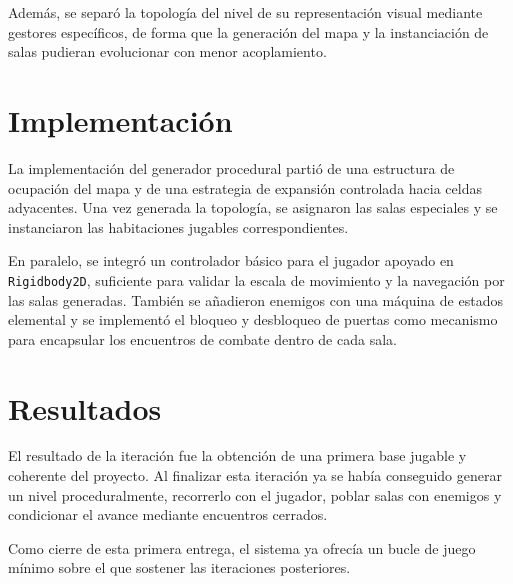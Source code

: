 Además, se separó la topología del nivel de su representación visual mediante gestores
específicos, de forma que la generación del mapa y la instanciación de salas pudieran
evolucionar con menor acoplamiento.

\section{Implementación}
La implementación del generador procedural partió de una estructura de ocupación del mapa y
de una estrategia de expansión controlada hacia celdas adyacentes. Una vez generada la
topología, se asignaron las salas especiales y se instanciaron las habitaciones jugables
correspondientes.

En paralelo, se integró un controlador básico para el jugador apoyado en
\texttt{Rigidbody2D}, suficiente para validar la escala de movimiento y la navegación por
las salas generadas. También se añadieron enemigos con una máquina de estados elemental y
se implementó el bloqueo y desbloqueo de puertas como mecanismo para encapsular los
encuentros de combate dentro de cada sala.

\section{Resultados}
El resultado de la iteración fue la obtención de una primera base jugable y coherente del
proyecto. Al finalizar esta iteración ya se había conseguido generar un nivel
proceduralmente, recorrerlo con el jugador, poblar salas con enemigos y condicionar el
avance mediante encuentros cerrados.

Como cierre de esta primera entrega, el sistema ya ofrecía un bucle de juego mínimo sobre
el que sostener las iteraciones posteriores.
